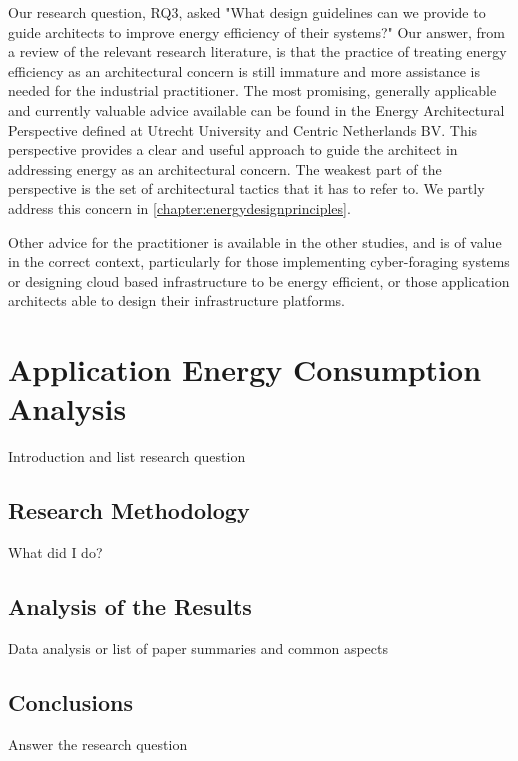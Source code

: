Our research question, RQ3, asked "What design guidelines can we provide to guide architects to improve energy efficiency of their systems?"  Our answer, from a  review of the relevant research literature, is that the practice of treating energy efficiency as an architectural concern is still immature and more assistance is needed for the industrial practitioner.  The most promising, generally applicable and currently valuable advice available can be found in the Energy Architectural Perspective defined at Utrecht University and Centric Netherlands BV.  This perspective provides a clear and useful approach to guide the architect in addressing energy as an architectural concern.  The weakest part of the perspective is the set of architectural tactics that it has to refer to.  We partly address this concern in \cref{chapter:energydesignprinciples}.

Other advice for the practitioner is available in the other studies, and is of value in the correct context, particularly for those implementing cyber-foraging systems or designing cloud based infrastructure to be energy efficient, or those application architects able to design their infrastructure platforms.

\section{Application Energy Consumption Analysis} \label{sec:litreviewenergy}

Introduction and list research question

\subsection{Research Methodology}

What did I do?

\subsection{Analysis of the Results}

Data analysis or list of paper summaries and common aspects

\subsection{Conclusions}

Answer the research question
